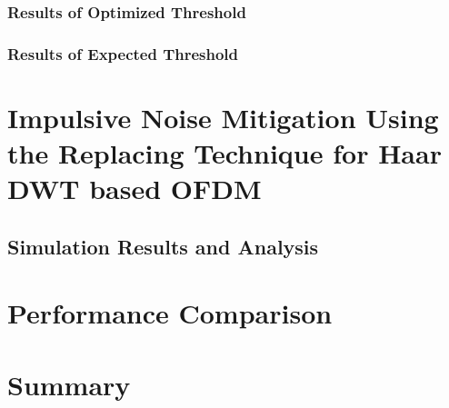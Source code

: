	\subsubsection{Results of Optimized Threshold}
			\subsubsection{Results of Expected Threshold} \label{subsub5:expected}

	\section{Impulsive Noise Mitigation Using the Replacing Technique for Haar DWT based OFDM }\label{sec5:proposedT}
		 
	\subsection{Simulation Results and Analysis}
		
	\section{Performance Comparison}\label{sec5:performaceComparison}
	
	\section{Summary} \label{sec5:summary}
	
